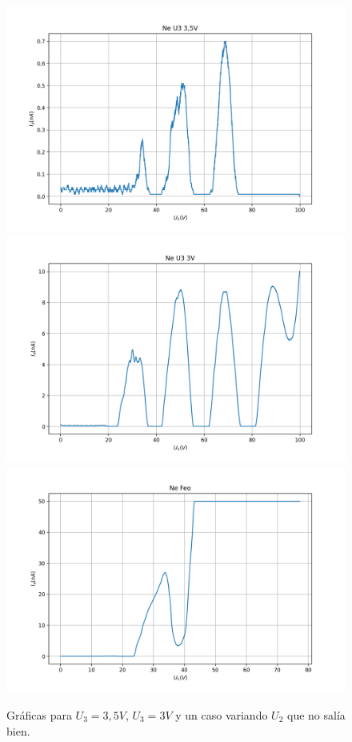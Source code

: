 \documentclass{article}
\begin{document}
\begin{figure}[h!]
\begin{center}
\includegraphics[max width=0.32\linewidth]{Ne U3 3,5V}
\includegraphics[max width=0.32\linewidth]{Ne U3 3V}
\includegraphics[max width=0.32\linewidth]{Ne Feo}
\caption{Gráficas para $U_3 = 3,5V$, $U_3 = 3V$ y un caso variando $U_2$ que no salía bien.}
\end{center}
\end{figure}

\printbibliography
\end{document}
